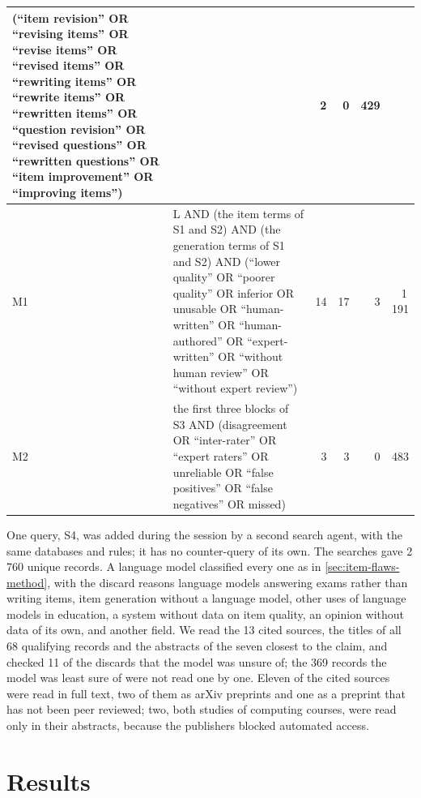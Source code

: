 \begin{table}[htbp]
\begin{tabularx}{\linewidth}{@{}l>{\raggedright\arraybackslash}X
    rrrr@{}}
         (\enquote{item revision} OR \enquote{revising items} OR
         \enquote{revise items} OR \enquote{revised items} OR
         \enquote{rewriting items} OR \enquote{rewrite items} OR
         \enquote{rewritten items} OR \enquote{question revision} OR
         \enquote{revised questions} OR \enquote{rewritten questions} OR
         \enquote{item improvement} OR \enquote{improving items})
       & 1 & 2 & 0 & 429 \\
    \midrule
    M1 & L AND (the item terms of S1 and S2) AND (the generation terms of
         S1 and S2) AND (\enquote{lower quality} OR \enquote{poorer
         quality} OR inferior OR unusable OR \enquote{human-written} OR
         \enquote{human-authored} OR \enquote{expert-written} OR
         \enquote{without human review} OR \enquote{without expert review})
       & 14 & 17 & 3 & 1\,191 \\
    M2 & the first three blocks of S3 AND (disagreement OR
         \enquote{inter-rater} OR \enquote{expert raters} OR unreliable OR
         \enquote{false positives} OR \enquote{false negatives} OR missed)
       & 3 & 3 & 0 & 483 \\
    \bottomrule
  \end{tabularx}
\end{table}

One query, S4, was added during the session by a second search agent,
with the same databases and rules; it has no counter-query of its own.
The searches gave 2\,760 unique records.  A language model classified
every one as in \cref{sec:item-flaws-method}, with the discard reasons
language models answering exams rather than writing items, item
generation without a language model, other uses of language models in
education, a system without data on item quality, an opinion without data
of its own, and another field.  We read the 13 cited sources, the titles
of all 68 qualifying records and the abstracts of the seven closest to
the claim, and checked 11 of the discards that the model was unsure of;
the 369 records the model was least sure of were not read one by one.
Eleven of the cited sources were read in full text, two of them as arXiv
preprints and one as a preprint that has not been peer reviewed; two,
both studies of computing courses, were read only in their abstracts,
because the publishers blocked automated access.

\section{Results}
\label{sec:llm-items-results}

